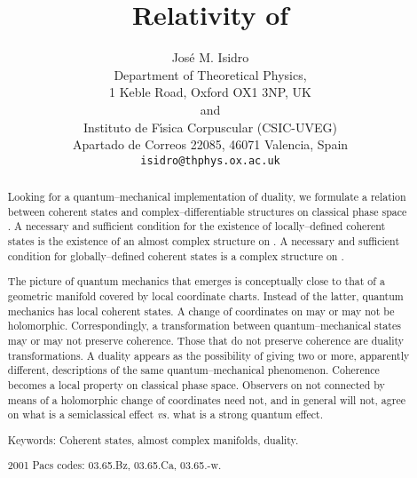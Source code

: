 \documentclass[a4paper,a4paper]{article}
\begin{document}
\title{Relativity of \myHighlight{$\hbar$}\coordHE{}}
\author{Jos\'e M. Isidro \\ 
Department of Theoretical Physics,\\ 
1 Keble Road, Oxford OX1 3NP, UK\\ 
and\\
Instituto de F\'{\i}sica Corpuscular (CSIC-UVEG)\\
Apartado de Correos 22085, 46071 Valencia, Spain\\
{\tt isidro@thphys.ox.ac.uk}}
\maketitle

\begin{abstract}

Looking for a quantum--mechanical implementation of duality,
we formulate a relation between coherent states and complex--differentiable 
structures on classical phase space \coordHE{}. 
A necessary and sufficient condition for the existence of 
locally--defined coherent states is the existence of an almost complex 
structure on \coordHE{}. A necessary and sufficient condition 
for globally--defined coherent states is a complex structure on \coordHE{}.  

The picture of quantum mechanics that emerges is conceptually close to that of a 
geometric manifold covered by local coordinate charts. Instead of the 
latter, quantum mechanics has local coherent states. A change of 
coordinates on \coordHE{} may or may not be holomorphic. Correspondingly, 
a transformation between quantum--mechanical states may or may not preserve 
coherence. Those that do not preserve coherence are duality 
transformations. A duality appears as the possibility of giving 
two or more, apparently different, descriptions 
of the same quantum--mechanical phenomenon.
Coherence becomes a local property on classical phase space. 
Observers on \coordHE{} not connected by means of a holomorphic change of 
coordinates need not, and in general will not, agree on what is a semiclassical 
effect {\it vs.} what is a strong quantum effect. 

Keywords: Coherent states, almost complex manifolds, duality.

2001 Pacs codes: 03.65.Bz, 03.65.Ca, 03.65.-w.


\end{abstract}
\end{document}
